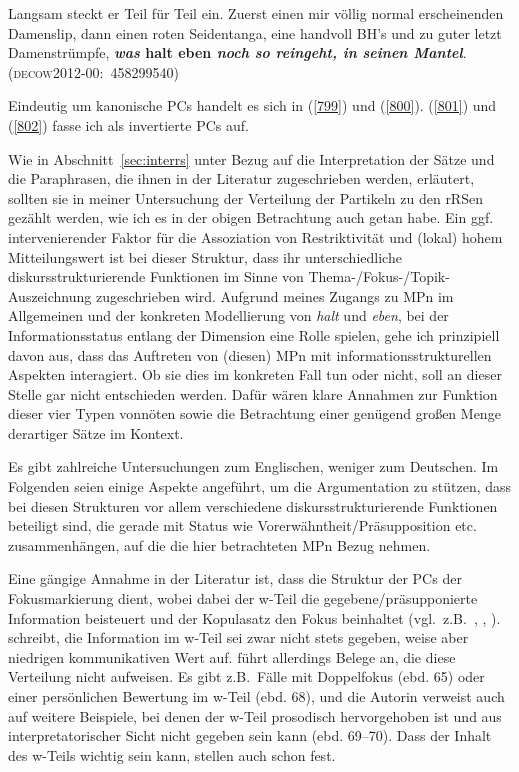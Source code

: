 \begin{exe}
	\ex\label{802} 

	Langsam steckt er Teil für Teil ein. Zuerst einen mir völlig normal erscheinenden Damenslip, dann einen roten Seidentanga, eine handvoll BH's und zu guter letzt Damenstrümpfe, \textbf{\textit{was} halt eben \textit{noch so reingeht, in seinen 		Mantel}}.                      	
	\hfill\hbox{\scshape(decow2012-00: 458299540)}
\end{exe}
Eindeutig um kanonische PCs handelt es sich in (\ref{799}) und (\ref{800}). (\ref{801}) und (\ref{802}) fasse ich als invertierte PCs auf.

Wie in Abschnitt~\ref{sec:interrs} unter Bezug auf die Interpretation der Sätze und die Paraphrasen, die ihnen in der Literatur zugeschrieben werden, erläutert, sollten sie in meiner Untersuchung der Verteilung der Partikeln zu den rRSen gezählt werden, wie ich es in der obigen Betrachtung auch getan habe. Ein ggf. intervenierender Faktor für die Assoziation von Restriktivität und (lokal) hohem Mitteilungswert ist bei dieser Struktur, dass ihr unterschiedliche diskursstrukturierende Funktionen im Sinne von Thema-\slash Fokus-\slash Topik-Aus\-zeich\-nung zugeschrieben wird. Aufgrund meines Zugangs zu MPn im Allgemeinen und der konkreten Modellierung von \textit{halt} und \textit{eben}, bei der Informationsstatus entlang der Dimension  eine Rolle spielen, gehe ich prinzipiell davon aus, dass das Auftreten von (diesen) MPn mit informationsstrukturellen Aspekten interagiert. Ob sie dies im konkreten Fall tun oder nicht, soll an dieser Stelle gar nicht entschie\-den werden. Dafür wären klare Annahmen zur Funktion dieser vier Typen vonnöten sowie die Betrachtung einer genügend großen Menge derartiger Sätze im Kontext.

Es gibt zahlreiche Untersuchungen zum Englischen, weniger zum Deutschen. Im Folgenden seien einige Aspekte angeführt, um die Argumentation zu stützen, dass bei diesen Strukturen vor allem verschiedene diskursstrukturierende Funktionen beteiligt sind, die gerade mit Status wie Vorerwähntheit/Präsupposition etc. zusammenhängen, auf die die hier betrachteten MPn Bezug nehmen.

Eine gängige Annahme in der Literatur ist, dass die Struktur der PCs der Fokusmarkierung  dient, wobei dabei der w-Teil die gegebene/präsupponierte Information beisteuert und der Kopulasatz den Fokus beinhaltet (vgl.\ z.B.\ \citealt{Prince1978}, \citealt{Collins1991}, \citealt{Lambrecht2001}). \citet[465--466]{Huddleston1984} schreibt, die Information im w-Teil sei zwar nicht stets gegeben, weise aber niedrigen kommunikativen Wert auf. \citet[65]{Guenthner2006} führt allerdings Belege an, die diese Verteilung nicht aufweisen. Es gibt z.B.\ Fälle mit Doppelfokus (ebd. 65) oder einer persönlichen Bewertung im w-Teil (ebd. 68), und die Autorin verweist auch auf weitere Beispiele, bei denen der w-Teil prosodisch hervorgehoben ist und aus interpretatorischer Sicht nicht gegeben sein kann (ebd. 69--70). Dass der Inhalt des w-Teils wichtig sein kann, stellen auch schon \citet{Weinert1996} fest.

